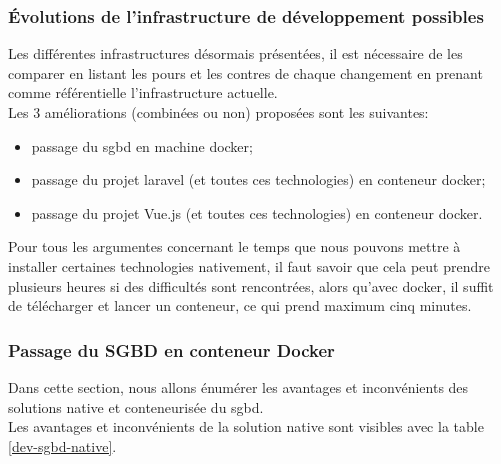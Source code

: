 \documentclass[
    iai, %
    il, %
]{heig-tb}
\begin{document}
\subsubsection{Évolutions de l'infrastructure de développement possibles}
Les différentes infrastructures désormais présentées, il est nécessaire de les comparer en listant les pours et les contres de chaque changement en prenant comme référentielle l'infrastructure actuelle. \\
Les 3 améliorations (combinées ou non) proposées sont les suivantes:
\begin{itemize}
    \item passage du \Gls{sgbd} en machine \Gls{docker};
    \item passage du projet \Gls{laravel} (et toutes ces technologies) en \Gls{conteneur} \Gls{docker};
    \item passage du projet Vue.js (et toutes ces technologies) en \Gls{conteneur} \Gls{docker}.
\end{itemize}

Pour tous les argumentes concernant le temps que nous pouvons mettre à installer certaines technologies nativement, il faut savoir que cela peut prendre plusieurs heures si des difficultés sont rencontrées, alors qu'avec \Gls{docker}, il suffit de télécharger et lancer un \Gls{conteneur}, ce qui prend maximum cinq minutes.

\subsubsection{Passage du SGBD en conteneur Docker}
Dans cette section, nous allons énumérer les avantages et inconvénients des solutions native et conteneurisée du \Gls{sgbd}. \\
Les avantages et inconvénients de la solution native sont visibles avec la table \ref{dev-sgbd-native}.
\end{document}
